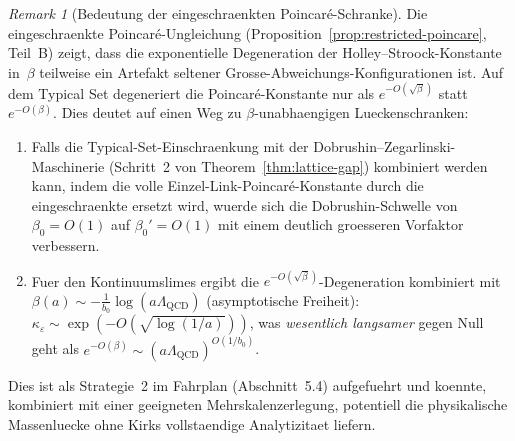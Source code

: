 \documentclass[12pt,a4paper]{article}
\theoremstyle{definition}
\theoremstyle{plain}
\theoremstyle{remark}
\newtheorem{remark}[definition]{Remark}
\begin{document}
\begin{remark}[Bedeutung der eingeschraenkten Poincar\'e-Schranke]
\label{rem:restricted-significance}
Die eingeschraenkte Poincar\'e-Ungleichung (Proposition~\ref{prop:restricted-poincare}, Teil~B) zeigt, dass die exponentielle Degeneration der Holley--Stroock-Konstante in~$\beta$ teilweise ein Artefakt seltener Grosse-Abweichungs-Konfigurationen ist. Auf dem Typical Set degeneriert die Poincar\'e-Konstante nur als $e^{-O(\sqrt{\beta})}$ statt $e^{-O(\beta)}$. Dies deutet auf einen Weg zu $\beta$-unabhaengigen Lueckenschranken:

\begin{enumerate}
    \item Falls die Typical-Set-Einschraenkung mit der Dobrushin--Zegarlinski-Maschinerie (Schritt~2 von Theorem~\ref{thm:lattice-gap}) kombiniert werden kann, indem die volle Einzel-Link-Poincar\'e-Konstante durch die eingeschraenkte ersetzt wird, wuerde sich die Dobrushin-Schwelle von $\beta_0 = O(1)$ auf $\beta_0' = O(1)$ mit einem deutlich groesseren Vorfaktor verbessern.
    \item Fuer den Kontinuumslimes ergibt die $e^{-O(\sqrt{\beta})}$-Degeneration kombiniert mit $\beta(a) \sim -\frac{1}{b_0}\log(a\Lambda_{\mathrm{QCD}})$ (asymptotische Freiheit): $\kappa_\varepsilon \sim \exp(-O(\sqrt{\log(1/a)}))$, was \emph{wesentlich langsamer} gegen Null geht als $e^{-O(\beta)} \sim (a\Lambda_{\mathrm{QCD}})^{O(1/b_0)}$.
\end{enumerate}
Dies ist als Strategie~2 im Fahrplan (Abschnitt~5.4) aufgefuehrt und koennte, kombiniert mit einer geeigneten Mehrskalenzerlegung, potentiell die physikalische Massenluecke ohne Kirks vollstaendige Analytizitaet liefern.
\end{remark}
\end{document}
